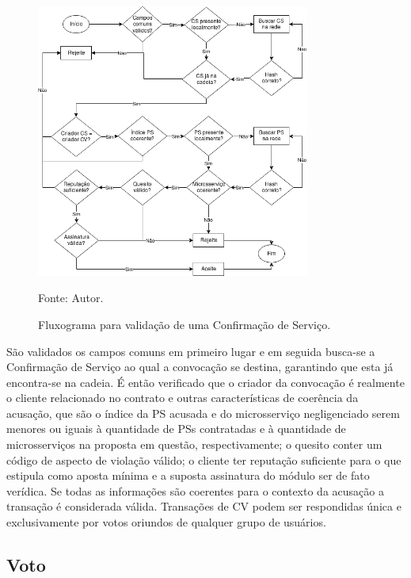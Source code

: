 \begin{figure}[ht!]
\caption{Fluxograma para validação de uma Confirmação de Serviço.}
\centering
\includegraphics[width=0.8\textwidth]{imagens/validacao_cv.png}
\begin{center}
        Fonte: Autor.
\end{center}
\label{fig:validacao_cv}
\end{figure}

São validados os campos comuns em primeiro lugar e em seguida busca-se a Confirmação de Serviço ao qual a convocação se destina, garantindo que esta já encontra-se na cadeia. É então verificado que o criador da convocação é realmente o cliente relacionado no contrato e outras características de coerência da acusação, que são o índice da \ac{PS} acusada  e do microsserviço negligenciado serem menores ou iguais à quantidade de \acp{PS} contratadas e à quantidade de microsserviços na proposta em questão, respectivamente; o quesito conter um código de aspecto de violação válido; o cliente ter reputação suficiente para o que estipula como aposta mínima e a suposta assinatura do módulo ser de fato verídica. Se todas as informações são coerentes para o contexto da acusação a transação é considerada válida.
%
Transações de \ac{CV} podem ser respondidas única e exclusivamente por votos oriundos de qualquer grupo de usuários.

\subsection{Voto}
\label{sec:proposta:auditoria:voto}


